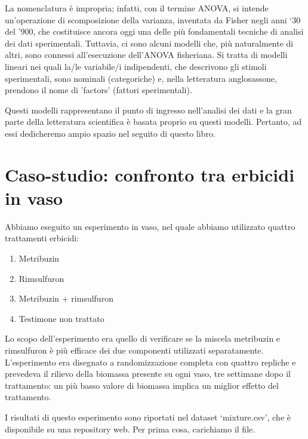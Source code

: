 \documentclass[a4paper,12pt,oneside]{book}
\providecommand{\tightlist}{%
  \setlength{\itemsep}{0pt}\setlength{\parskip}{0pt}}
\begin{document}
La nomenclatura è impropria; infatti, con il termine ANOVA, si intende un'operazione di scomposizione della varianza, inventata da Fisher negli anni `30 del '900, che costituisce ancora oggi una delle più fondamentali tecniche di analisi dei dati sperimentali. Tuttavia, ci sono alcuni modelli che, più naturalmente di altri, sono connessi all'esecuzione dell'ANOVA fisheriana. Si tratta di modelli lineari nei quali la/le variabile/i indipendenti, che descrivono gli stimoli sperimentali, sono nominali (categoriche) e, nella letteratura anglosassone, prendono il nome di 'factors' (fattori sperimentali).

Questi modelli rappresentano il punto di ingresso nell'analisi dei dati e la gran parte della letteratura scientifica è basata proprio su questi modelli. Pertanto, ad essi dedicheremo ampio spazio nel seguito di questo libro.

\hypertarget{caso-studio-confronto-tra-erbicidi-in-vaso}{%
\section{Caso-studio: confronto tra erbicidi in vaso}\label{caso-studio-confronto-tra-erbicidi-in-vaso}}

Abbiamo eseguito un esperimento in vaso, nel quale abbiamo utilizzato quattro trattamenti erbicidi:

\begin{enumerate}
\def\labelenumi{\arabic{enumi}.}
\tightlist
\item
  Metribuzin
\item
  Rimsulfuron
\item
  Metribuzin + rimsulfuron
\item
  Testimone non trattato
\end{enumerate}

Lo scopo dell'esperimento era quello di verificare se la miscela metribuzin e rimsulfuron è più efficace dei due componenti utilizzati separatamente. L'esperimento era disegnato a randomizzazione completa con quattro repliche e prevedeva il rilievo della biomassa presente su ogni vaso, tre settimane dopo il trattamento: un più basso valore di biomassa implica un miglior effetto del trattamento.

I risultati di questo esperimento sono riportati nel dataset `mixture.csv', che è disponibile su una repository web. Per prima cosa, carichiamo il file.

\vspace{12pt}
\end{document}
